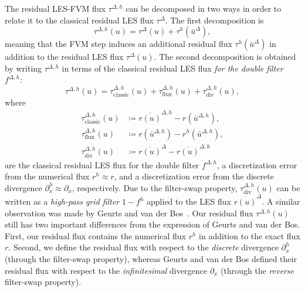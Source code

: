 \documentclass[preprint,twocolumn,5p]{elsarticle}
\begin{document}
The residual LES-FVM flux
$\tau^{\Delta, h}$
can be decomposed in two ways in order to relate it to the classical residual
LES flux $\tau^\Delta$. The first decomposition is
\begin{equation}
    \tau^{\Delta, h}(u) = \tau^\Delta(u) + \tau^h(\bar{u}^\Delta),
\end{equation}
meaning that the FVM step induces an additional residual flux
$\tau^h(\bar{u}^\Delta)$ in addition to the residual LES flux
$\tau^\Delta(u)$.
The second decomposition is obtained by writing $\tau^{\Delta, h}$ in terms of
the classical residual LES flux \emph{for the double filter $f^{\Delta, h}$}:
\begin{equation} \label{eq:tau-Delta-h-decomposition}
    \tau^{\Delta, h}(u) =
    \tau^{\Delta, h}_\text{classic}(u) +
    \tau^{\Delta, h}_\text{flux}(u) +
    \tau^{\Delta, h}_\text{div}(u),
\end{equation}
where
\begin{align}
    \tau^{\Delta, h}_\text{classic}(u)
    & \coloneq \overline{r(u)}^{\Delta, h} - r(\bar{u}^{\Delta, h}), \\
    \tau^{\Delta, h}_\text{flux}(u)
    & \coloneq r(\bar{u}^{\Delta, h}) - r^h(\bar{u}^{\Delta, h}), \\
    \tau^{\Delta, h}_\text{div}(u)
    & \coloneq \overline{r(u)}^\Delta - \overline{r(u)}^{\Delta, h}
\end{align}
are the classical residual LES flux for the double filter $f^{\Delta, h}$,
a discretization error from the numerical flux $r^h \approx r$, and
a discretization error from the discrete divergence
$\partial^h_x \approx \partial_x$, respectively.
Due to the filter-swap property,
$\tau^{\Delta, h}_\text{div}(u)$ can be written as a \emph{high-pass grid filter} $1 - f^h$
applied to the LES flux $\overline{r(u)}^\Delta$.
A similar observation was made by Geurts and van der
Bos~\cite{geurtsNumericallyInducedHighpass2005}.
Our residual flux $\tau^{\Delta, h}(u)$ still has two
important differences from the expression of Geurts and van der Bos.
First, our residual flux contains the numerical flux $r^h$ in addition to the
exact flux $r$.
Second, we define the residual flux with respect to the
\emph{discrete} divergence $\partial^h_x$
(through the filter-swap property),
whereas Geurts and van der Bos defined their residual flux with
respect to the \emph{infinitesimal} divergence $\partial_x$
(through the \emph{reverse} filter-swap property).
\end{document}
